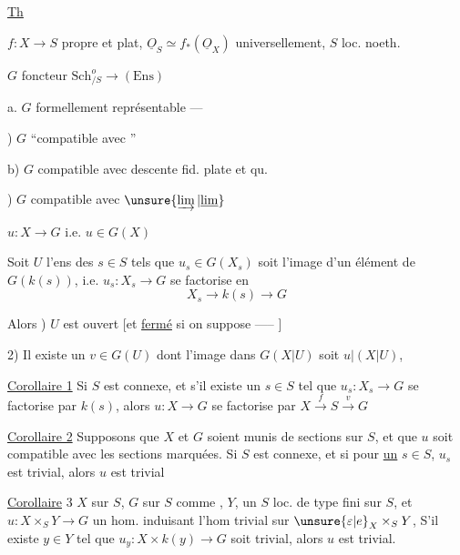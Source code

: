 \uline{Th}

$f:X\longrightarrow S$ propre et plat, $\underline O_S\simeq f_*(\underline O_X)$ universellement, $S$ loc. noeth.

$G$ foncteur $\mathrm{Sch}_{/S}^{o}\longrightarrow(\mathrm{Ens})$


a. $G$ formellement représentable ---


) $G$ ``compatible avec  ''

b) $G$  compatible avec descente fid. plate et qu. 

) $G$ compatible avec $\unsure{\varinjlim|\underline{\lim}}$  


$u:X\to G$ i.e. $u\in G(X)$

Soit $U$ l'ens des $s\in S$ tels que $u_s\in G(X_s)$ soit l'image d'un élément de $G(k(s))$, i.e. $u_s:X_s\to G$ se factorise en
\[
X_s\longrightarrow k(s)\longrightarrow G
\]

Alors ) $U$ est ouvert [et \uline{fermé} si on suppose ----- ]

2) Il existe un  $v\in G(U)$  dont l'image dans $G(X|U)$ soit $u|(X|U)$, 

\uline{Corollaire 1} Si $S$ est connexe, et s'il existe un $s\in S$ tel que $u_s:X_s\to G$ se factorise par $k(s)$, alors $u:X\to G$ se factorise par $X\xrightarrow{f}S\xrightarrow{v}G$

\uline{Corollaire 2} Supposons que $X$ et $G$ soient munis de sections sur $S$, et que $u$ soit compatible avec les sections marquées. Si $S$ est connexe, et si pour \uline{un} $s\in S$, $u_s$ est trivial, alors $u$ est trivial

\uline{Corollaire} 3 \quad $X$ sur $S$,  $G$ sur $S$ comme   , $Y$, un $S$ loc. de type fini sur $S$,  et $u:X\times_S Y\to G$ un hom. induisant  l'hom trivial sur $\unsure{\varepsilon|e}_X\times_S Y$,  S'il existe $y\in Y$ tel que $u_y:X\times k(y)\to G$ soit trivial, alors $u$ est trivial.
